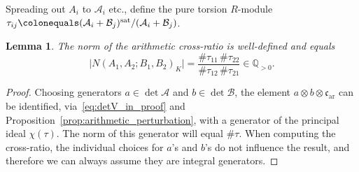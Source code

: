 \documentclass[11pt,a4paper]{amsart}
\newcommand{\Q}{\mathbb{Q}}
\newcommand{\xc}{\mathfrak{c}}
\newcommand{\sat}{{\operatorname{sat}}}
\theoremstyle{plain}
\newtheorem{lemma}[theorem]{Lemma}
\theoremstyle{definition}
\theoremstyle{remark}
\newcommand{\ca}{\mathcal{A}}
\newcommand{\cb}{\mathcal{B}}
\newcommand{\coleq}{\colonequals}
\newcommand{\xca}[1][]{\xc_{\mathrm{ar}#1}} %
\begin{document}
Spreading out $A_i$ to $\ca_i$ etc., define the pure torsion $R$-module $\tau_{ij} \coleq (\ca_i + \cb_j)^{\sat}/(\ca_i + \cb_j)$.

\begin{lemma}\label{lem:norm_of_crossratio}
  The norm of the arithmetic cross-ratio is well-defined and equals
  \[
    \bigl\lvert N(A_1, A_2; B_1, B_2)_K \bigr\rvert = \frac{\#\tau_{11} \, \#\tau_{22}}{\#\tau_{12} \, \#\tau_{21}} \in \Q_{>0}.
  \]
\end{lemma}
\begin{proof}
  Choosing generators $a \in \det \ca$ and $b \in \det \cb$, the element $a \otimes b \otimes \xca$ can be identified, via~\eqref{eq:detV_in_proof} and Proposition~\ref{prop:arithmetic_perturbation}, with a generator of the principal ideal $\chi(\tau)$. The norm of this generator will equal $\#\tau$. When computing the cross-ratio, the individual choices for $a$'s and $b$'s do not influence the result, and therefore we can always assume they are integral generators.
\end{proof}



\printbibliography
\end{document}
